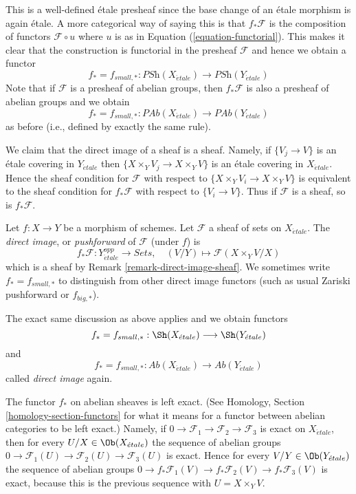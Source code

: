 \noindent
This is a well-defined \'etale presheaf since the base change of an \'etale
morphism is again \'etale. A more categorical way of saying this is that
$f_*\mathcal{F}$ is the composition of functors $\mathcal{F} \circ u$
where $u$ is as in Equation (\ref{equation-functorial}). This makes it
clear that the construction is functorial in the presheaf
$\mathcal{F}$ and hence we obtain a functor
$$
f_* = f_{small, *} :
\textit{PSh}(X_{\acute{e}tale})
\longrightarrow
\textit{PSh}(Y_{\acute{e}tale})
$$
Note that if $\mathcal{F}$ is a presheaf of abelian groups, then
$f_*\mathcal{F}$ is also a presheaf of abelian groups and we obtain
$$
f_* = f_{small, *} :
\textit{PAb}(X_{\acute{e}tale})
\longrightarrow
\textit{PAb}(Y_{\acute{e}tale})
$$
as before (i.e., defined by exactly the same rule).

\begin{remark}
\label{remark-direct-image-sheaf}
We claim that the direct image of a sheaf is a sheaf.
Namely, if $\{V_j \to V\}$ is an \'etale covering in $Y_{\acute{e}tale}$
then $\{X \times_Y V_j \to X \times_Y V\}$ is an \'etale covering in
$X_{\acute{e}tale}$. Hence the sheaf condition for $\mathcal{F}$ with respect
to $\{X \times_Y V_i \to X \times_Y V\}$
is equivalent to the sheaf condition for $f_*\mathcal{F}$ with respect to
$\{V_i \to V\}$. Thus if $\mathcal{F}$ is a sheaf, so is
$f_*\mathcal{F}$.
\end{remark}

\begin{definition}
\label{definition-direct-image-sheaf}
Let $f: X\to Y$ be a morphism of schemes.
Let $\mathcal{F} $ a sheaf of sets on $X_{\acute{e}tale}$.
The {\it direct image}, or {\it pushforward} of $\mathcal{F}$
(under $f$) is
$$
f_*\mathcal{F} : Y_{\acute{e}tale}^{opp} \longrightarrow \textit{Sets}, \quad
(V/Y) \longmapsto \mathcal{F}(X \times_Y V/X)
$$
which is a sheaf by
Remark \ref{remark-direct-image-sheaf}.
We sometimes write $f_* = f_{small, *}$ to distinguish from other
direct image functors (such as usual Zariski pushforward or $f_{big, *}$).
\end{definition}

\noindent
The exact same discussion as above applies and we obtain functors
$$
f_* = f_{small, *} :
\Sh(X_{\acute{e}tale})
\longrightarrow
\Sh(Y_{\acute{e}tale})
$$
and
$$
f_* = f_{small, *} :
\textit{Ab}(X_{\acute{e}tale})
\longrightarrow
\textit{Ab}(Y_{\acute{e}tale})
$$
called {\it direct image} again.

\medskip\noindent
The functor $f_*$ on abelian sheaves is left exact. (See
Homology, Section \ref{homology-section-functors}
for what it means for a functor between abelian categories to be left exact.)
Namely, if
$0 \to \mathcal{F}_1 \to \mathcal{F}_2 \to \mathcal{F}_3$
is exact on $X_{\acute{e}tale}$, then for every
$U/X \in \Ob(X_{\acute{e}tale})$
the sequence of abelian groups
$0 \to \mathcal{F}_1(U) \to \mathcal{F}_2(U) \to \mathcal{F}_3(U)$
is exact. Hence for every $V/Y \in \Ob(Y_{\acute{e}tale})$
the sequence of abelian groups
$0 \to f_*\mathcal{F}_1(V) \to f_*\mathcal{F}_2(V) \to f_*\mathcal{F}_3(V)$
is exact, because this is the previous sequence with $U = X \times_Y V$.

